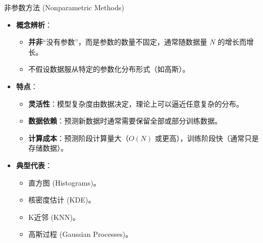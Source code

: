 \documentclass[12pt, aspectratio=169]{beamer}
\begin{document}
\begin{frame}{非参数方法 (Nonparametric Methods)}
    \begin{itemize}
        \item \textbf{概念辨析}：
        \begin{itemize}
            \item \textbf{并非}“没有参数”，而是参数的数量不固定，通常随数据量 $N$ 的增长而增长。
            \item 不假设数据服从特定的参数化分布形式（如高斯）。
        \end{itemize}
        \item \textbf{特点}：
        \begin{itemize}
            \item \textbf{灵活性}：模型复杂度由数据决定，理论上可以逼近任意复杂的分布。
            \item \textbf{数据依赖}：预测新数据时通常需要保留全部或部分训练数据。
            \item \textbf{计算成本}：预测阶段计算量大（$O(N)$ 或更高），训练阶段快（通常只是存储数据）。
        \end{itemize}
        \item \textbf{典型代表}：
        \begin{itemize}
            \item 直方图 (Histograms)。
            \item 核密度估计 (KDE)。
            \item K近邻 (KNN)。
            \item 高斯过程 (Gaussian Processes)。
        \end{itemize}
    \end{itemize}
\end{frame}
\end{document}
